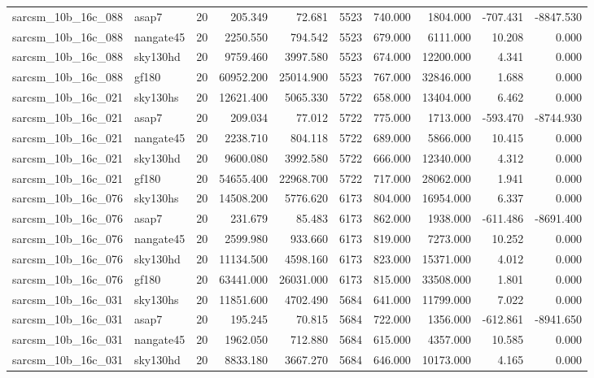 \documentclass{article}
\begin{document}
\begin{longtable}{llrrrrrrrr}
sarcsm\_10b\_16c\_088 & asap7 & 20 & 205.349 & 72.681 & 5523 & 740.000 & 1804.000 & -707.431 & -8847.530 \\
sarcsm\_10b\_16c\_088 & nangate45 & 20 & 2250.550 & 794.542 & 5523 & 679.000 & 6111.000 & 10.208 & 0.000 \\
sarcsm\_10b\_16c\_088 & sky130hd & 20 & 9759.460 & 3997.580 & 5523 & 674.000 & 12200.000 & 4.341 & 0.000 \\
sarcsm\_10b\_16c\_088 & gf180 & 20 & 60952.200 & 25014.900 & 5523 & 767.000 & 32846.000 & 1.688 & 0.000 \\
sarcsm\_10b\_16c\_021 & sky130hs & 20 & 12621.400 & 5065.330 & 5722 & 658.000 & 13404.000 & 6.462 & 0.000 \\
sarcsm\_10b\_16c\_021 & asap7 & 20 & 209.034 & 77.012 & 5722 & 775.000 & 1713.000 & -593.470 & -8744.930 \\
sarcsm\_10b\_16c\_021 & nangate45 & 20 & 2238.710 & 804.118 & 5722 & 689.000 & 5866.000 & 10.415 & 0.000 \\
sarcsm\_10b\_16c\_021 & sky130hd & 20 & 9600.080 & 3992.580 & 5722 & 666.000 & 12340.000 & 4.312 & 0.000 \\
sarcsm\_10b\_16c\_021 & gf180 & 20 & 54655.400 & 22968.700 & 5722 & 717.000 & 28062.000 & 1.941 & 0.000 \\
sarcsm\_10b\_16c\_076 & sky130hs & 20 & 14508.200 & 5776.620 & 6173 & 804.000 & 16954.000 & 6.337 & 0.000 \\
sarcsm\_10b\_16c\_076 & asap7 & 20 & 231.679 & 85.483 & 6173 & 862.000 & 1938.000 & -611.486 & -8691.400 \\
sarcsm\_10b\_16c\_076 & nangate45 & 20 & 2599.980 & 933.660 & 6173 & 819.000 & 7273.000 & 10.252 & 0.000 \\
sarcsm\_10b\_16c\_076 & sky130hd & 20 & 11134.500 & 4598.160 & 6173 & 823.000 & 15371.000 & 4.012 & 0.000 \\
sarcsm\_10b\_16c\_076 & gf180 & 20 & 63441.000 & 26031.000 & 6173 & 815.000 & 33508.000 & 1.801 & 0.000 \\
sarcsm\_10b\_16c\_031 & sky130hs & 20 & 11851.600 & 4702.490 & 5684 & 641.000 & 11799.000 & 7.022 & 0.000 \\
sarcsm\_10b\_16c\_031 & asap7 & 20 & 195.245 & 70.815 & 5684 & 722.000 & 1356.000 & -612.861 & -8941.650 \\
sarcsm\_10b\_16c\_031 & nangate45 & 20 & 1962.050 & 712.880 & 5684 & 615.000 & 4357.000 & 10.585 & 0.000 \\
sarcsm\_10b\_16c\_031 & sky130hd & 20 & 8833.180 & 3667.270 & 5684 & 646.000 & 10173.000 & 4.165 & 0.000 \\

\end{longtable}
\end{document}
